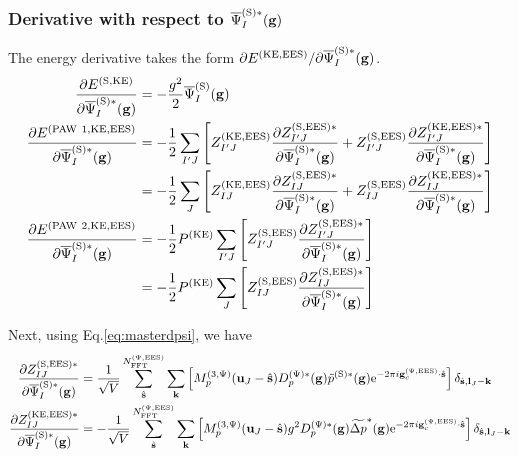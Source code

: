 \documentclass[paper=a4, fontsize=11pt]{article} %
\numberwithin{equation}{section} %
\numberwithin{figure}{section} %
\numberwithin{table}{section} %
\newcommand{\p}{\partial}
\newcommand{\wt}{\widetilde}
\newcommand{\bu}{{\bf{u}}}
\newcommand{\bl}{{\bf{l}}}
\newcommand{\bk}{{\bf{k}}}
\newcommand{\bs}{{\bf{s}}}
\newcommand{\bg}{{\bf{g}}}
\newcommand{\rS}{{\mathrm{S}}}
\newcommand{\rKE}{{\mathrm{KE}}}
\newcommand{\rEES}{{\mathrm{EES}}}
\newcommand{\re}{{\mathrm{e}}}
\newcommand{\rP}{{\mathrm{PAW}}}
\newcommand{\gcpEES}{{\bg_c^{(\Psi,\rEES)}}}
\newcommand{\psigs}{{\overline \Psi_I^{(\rS)}(\bg)}}
\newcommand{\psigsc}{{\overline \Psi_I^{(\rS)*}(\bg)}}
\newcommand{\NFFTpEES}{{N^{\mathrm{(\Psi,\rEES})}_{\mathrm{FFT}}}}
\newcommand{\Dpgc}{{D^{(\Psi)*}_p(\bg)}}
\newcommand{\Mp}{{M_p^{(3,\Psi)}}}
\begin{document}
\subsubsection{Derivative with respect to $\psigsc$}
The energy derivative takes the form $\p E^{(\rKE,\rEES)}/\p \psigsc$. \\
\begin{equation}
\begin{split}
\frac{\p E^{(\rS,\rKE)}}{\p \psigsc}
& = -\frac{g^2 }{2}\psigs \\
\frac{\p E^{(\rP\ 1,\rKE,\rEES)}}{\p \psigsc}
&= -\frac{1}{2} \sum_{I'J}\left[Z_{I'J}^{(\rKE,\rEES)}\frac{\p Z_{I'J}^{(\rS,\rEES)*}}{\p \psigsc} + Z_{I'J}^{(\rS,\rEES)} \frac{\p Z_{I'J}^{(\rKE,\rEES)*}}{\p \psigsc}\right]\\
&= -\frac{1}{2} \sum_{J}\left[Z_{IJ}^{(\rKE,\rEES)}\frac{\p Z_{IJ}^{(\rS,\rEES)*}}{\p \psigsc} + Z_{IJ}^{(\rS,\rEES)} \frac{\p Z_{IJ}^{(\rKE,\rEES)*}}{\p \psigsc}\right]\\
\frac{\p E^{(\rP\ 2,\rKE,\rEES)}}{\p \psigsc}
&= -\frac{1}{2} P^{(\rKE)}\sum_{I'J}\left[Z_{I'J}^{(\rS,\rEES)} \frac{\p Z_{I'J}^{(\rS,\rEES)*}}{\p \psigsc}\right] \\
&= -\frac{1}{2} P^{(\rKE)}\sum_{J}\left[Z_{IJ}^{(\rS,\rEES)}\frac{\p Z_{IJ}^{(\rS,\rEES)*}}{\p \psigsc}\right] \\
\end{split}
\end{equation}


Next, using Eq.\eqref{eq:masterdpsi}, we have
\begin{equation} \label{eq:dZSdpsi}
\begin{split}
\frac{\p Z^{(\rS,\rEES)*}_{IJ}}{\p \psigsc} &= \frac{1}{\sqrt{V}}\sum_{\hat \bs}^{\NFFTpEES} \sum_{\bk} \left[\Mp(\bu_{J}-\hat \bs) \Dpgc \tilde p^{(\rS)*}(\bg)\re^{-2\pi i\gcpEES \cdot \hat\bs}\right] \delta_{\hat \bs,\bl_J-\bk} \\
\frac{\p Z^{(\rKE,\rEES)*}_{IJ}}{\p \psigsc} &= -\frac{1}{\sqrt{V}}\sum_{\hat \bs}^{\NFFTpEES} \sum_{\bk} \left[\Mp(\bu_{J}-\hat \bs) g^2 \Dpgc \wt {\Delta p}^*(\bg)\re^{-2\pi i\gcpEES  \cdot \hat\bs}\right] \delta_{\hat \bs,\bl_J-\bk}
\end{split}
\end{equation}
\end{document}
